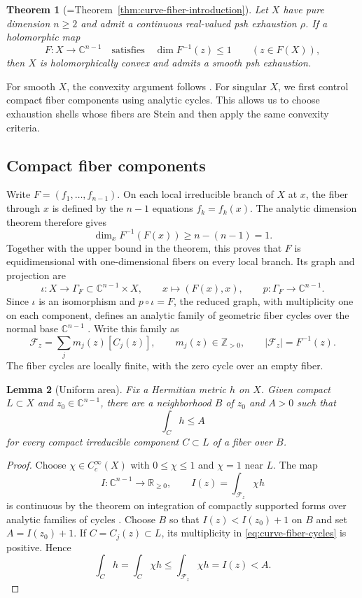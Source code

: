 \documentclass[11pt]{amsart}
\newtheorem{theorem}{Theorem}[section]
\newtheorem{lemma}[theorem]{Lemma}
\theoremstyle{definition}
\theoremstyle{remark}
\numberwithin{equation}{section}
\newcommand{\C}{\mathbb C}
\newcommand{\R}{\mathbb R}
\begin{document}
\begin{theorem}[=Theorem~\ref{thm:curve-fiber-introduction}]\label{thm:curve-fiber-convexity}
Let $X$ have pure dimension $n\ge2$ and admit a continuous real-valued
psh exhaustion $\rho$. If a holomorphic map
\[
 F:X\longrightarrow\C^{n-1}
 \quad\text{satisfies}\quad
 \dim F^{-1}(z)\le1\qquad(z\in F(X)),
\]
then $X$ is holomorphically convex and admits a smooth psh exhaustion.
\end{theorem}

For smooth $X$, the convexity argument follows
\cite[Corollary~4.2 and pp.~463--464]{VijituForum2022}.
For singular $X$, we first control compact fiber components using
analytic cycles. This allows us to choose exhaustion shells whose
fibers are Stein and then apply the same convexity criteria.

\subsection{Compact fiber components}
Write $F=(f_1,\ldots,f_{n-1})$. On each local irreducible branch of
$X$ at $x$, the fiber through $x$ is defined by the $n-1$ equations
$f_k=f_k(x)$. The analytic dimension theorem therefore gives
\[
 \dim_x F^{-1}(F(x))\ge n-(n-1)=1.
\]
Together with the upper bound in the theorem, this proves that $F$
is equidimensional with one-dimensional fibers on every local branch.
Its graph and projection are
\[
 \iota:X\longrightarrow\Gamma_F\subset\C^{n-1}\times X,
 \qquad x\longmapsto(F(x),x),\qquad
 p:\Gamma_F\longrightarrow\C^{n-1}.
\]
Since $\iota$ is an isomorphism and $p\circ\iota=F$, the reduced graph,
with multiplicity one on each component, defines an analytic family
of geometric fiber cycles over the normal base $\C^{n-1}$
\cite[Chapter~I, \S1(b), p.~816]{BarletMagnusson1998}. Write this family as
\begin{equation}\label{eq:curve-fiber-cycles}
 \mathcal F_z=\sum_jm_j(z)[C_j(z)],\qquad
 m_j(z)\in\mathbb Z_{>0},\qquad
 |\mathcal F_z|=F^{-1}(z).
\end{equation}
The fiber cycles are locally finite, with the zero cycle over an empty fiber.

\begin{lemma}[Uniform area]\label{curve:lem:area}
Fix a Hermitian metric $h$ on $X$. Given compact $L\subset X$ and
$z_0\in\C^{n-1}$, there are a neighborhood $B$ of $z_0$ and $A>0$
such that
\[
 \int_C h\le A
\]
for every compact irreducible component $C\subset L$ of a fiber over $B$.
\end{lemma}
\begin{proof}
Choose $\chi\in C_c^\infty(X)$ with $0\le\chi\le1$ and $\chi=1$
near $L$. The map
\[
 I:\C^{n-1}\longrightarrow\R_{\ge0},\qquad
 I(z)=\int_{\mathcal F_z}\chi h
\]
is continuous by the theorem on integration of compactly supported
forms over analytic families of cycles
\cite[Chapter~IV, Proposition~2.3.1]{BarletMagnusson2014}.
Choose $B$ so that $I(z)<I(z_0)+1$ on $B$ and set $A=I(z_0)+1$.
If $C=C_j(z)\subset L$, its multiplicity in
\eqref{eq:curve-fiber-cycles} is positive. Hence
\[
 \int_C h=\int_C\chi h
 \le\int_{\mathcal F_z}\chi h=I(z)<A.
\]
\end{proof}
\end{document}
